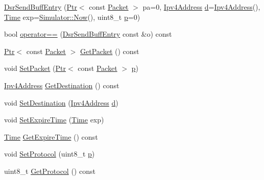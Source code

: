 \begin{DoxyCompactItemize}
\item 
\hyperlink{classns3_1_1dsr_1_1DsrSendBuffEntry_a6d54ee383906db3c6da87c52b3565303}{Dsr\+Send\+Buff\+Entry} (\hyperlink{classns3_1_1Ptr}{Ptr}$<$ const \hyperlink{classns3_1_1Packet}{Packet} $>$ pa=0, \hyperlink{classns3_1_1Ipv4Address}{Ipv4\+Address} \hyperlink{lte__pathloss_8m_a1aabac6d068eef6a7bad3fdf50a05cc8}{d}=\hyperlink{classns3_1_1Ipv4Address}{Ipv4\+Address}(), \hyperlink{classns3_1_1Time}{Time} exp=\hyperlink{classns3_1_1Simulator_ac3178fa975b419f7875e7105be122800}{Simulator\+::\+Now}(), uint8\+\_\+t \hyperlink{lte__link__budget__x2__handover__measures_8m_ac9de518908a968428863f829398a4e62}{p}=0)
\item 
bool \hyperlink{classns3_1_1dsr_1_1DsrSendBuffEntry_a98ad9273a644dc00d949640687d2b720}{operator==} (\hyperlink{classns3_1_1dsr_1_1DsrSendBuffEntry}{Dsr\+Send\+Buff\+Entry} const \&o) const 
\item 
\hyperlink{classns3_1_1Ptr}{Ptr}$<$ const \hyperlink{classns3_1_1Packet}{Packet} $>$ \hyperlink{classns3_1_1dsr_1_1DsrSendBuffEntry_a51f97693de53632b27066e4da9b9654f}{Get\+Packet} () const 
\item 
void \hyperlink{classns3_1_1dsr_1_1DsrSendBuffEntry_a7d3c55614a117654238cdb22247627a9}{Set\+Packet} (\hyperlink{classns3_1_1Ptr}{Ptr}$<$ const \hyperlink{classns3_1_1Packet}{Packet} $>$ \hyperlink{lte__link__budget__x2__handover__measures_8m_ac9de518908a968428863f829398a4e62}{p})
\item 
\hyperlink{classns3_1_1Ipv4Address}{Ipv4\+Address} \hyperlink{classns3_1_1dsr_1_1DsrSendBuffEntry_accc4d09ebea94217c5c43100e98a4776}{Get\+Destination} () const 
\item 
void \hyperlink{classns3_1_1dsr_1_1DsrSendBuffEntry_a60c1e53d9d6e0d586f25bfe805d5e5b8}{Set\+Destination} (\hyperlink{classns3_1_1Ipv4Address}{Ipv4\+Address} \hyperlink{lte__pathloss_8m_a1aabac6d068eef6a7bad3fdf50a05cc8}{d})
\item 
void \hyperlink{classns3_1_1dsr_1_1DsrSendBuffEntry_ac5f56445036674cd9c7d5d58cf89ca26}{Set\+Expire\+Time} (\hyperlink{classns3_1_1Time}{Time} exp)
\item 
\hyperlink{classns3_1_1Time}{Time} \hyperlink{classns3_1_1dsr_1_1DsrSendBuffEntry_ace62cdbf3ee5240e4d6be6a5a00226a2}{Get\+Expire\+Time} () const 
\item 
void \hyperlink{classns3_1_1dsr_1_1DsrSendBuffEntry_a9b49cb80598e00ada755c70f485b76e3}{Set\+Protocol} (uint8\+\_\+t \hyperlink{lte__link__budget__x2__handover__measures_8m_ac9de518908a968428863f829398a4e62}{p})
\item 
uint8\+\_\+t \hyperlink{classns3_1_1dsr_1_1DsrSendBuffEntry_a5cc4aa27aee73d5e5cd57bcdd1eeed34}{Get\+Protocol} () const 
\end{DoxyCompactItemize}
